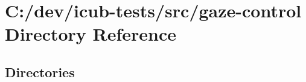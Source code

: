 \section{C\+:/dev/icub-\/tests/src/gaze-\/control Directory Reference}
\label{dir_bb6085b5660958491f908beff56f4e11}
\subsection*{Directories}
\begin{DoxyCompactItemize}
\end{DoxyCompactItemize}
